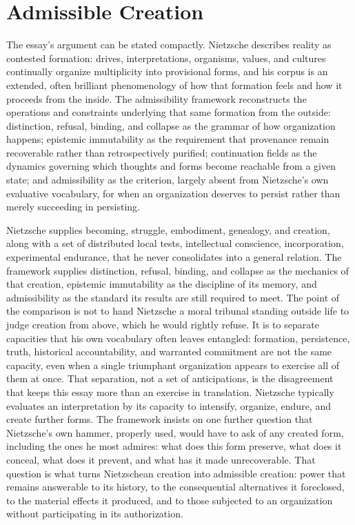 \documentclass[11pt]{article}
\begin{document}
\section*{Admissible Creation}

The essay's argument can be stated compactly. Nietzsche describes reality as contested formation: drives, interpretations, organisms, values, and cultures continually organize multiplicity into provisional forms, and his corpus is an extended, often brilliant phenomenology of how that formation feels and how it proceeds from the inside. The admissibility framework reconstructs the operations and constraints underlying that same formation from the outside: distinction, refusal, binding, and collapse as the grammar of how organization happens; epistemic immutability as the requirement that provenance remain recoverable rather than retrospectively purified; continuation fields as the dynamics governing which thoughts and forms become reachable from a given state; and admissibility as the criterion, largely absent from Nietzsche's own evaluative vocabulary, for when an organization deserves to persist rather than merely succeeding in persisting.

Nietzsche supplies becoming, struggle, embodiment, genealogy, and creation, along with a set of distributed local tests, intellectual conscience, incorporation, experimental endurance, that he never consolidates into a general relation. The framework supplies distinction, refusal, binding, and collapse as the mechanics of that creation, epistemic immutability as the discipline of its memory, and admissibility as the standard its results are still required to meet. The point of the comparison is not to hand Nietzsche a moral tribunal standing outside life to judge creation from above, which he would rightly refuse. It is to separate capacities that his own vocabulary often leaves entangled: formation, persistence, truth, historical accountability, and warranted commitment are not the same capacity, even when a single triumphant organization appears to exercise all of them at once. That separation, not a set of anticipations, is the disagreement that keeps this essay more than an exercise in translation. Nietzsche typically evaluates an interpretation by its capacity to intensify, organize, endure, and create further forms. The framework insists on one further question that Nietzsche's own hammer, properly used, would have to ask of any created form, including the ones he most admires: what does this form preserve, what does it conceal, what does it prevent, and what has it made unrecoverable. That question is what turns Nietzschean creation into admissible creation: power that remains answerable to its history, to the consequential alternatives it foreclosed, to the material effects it produced, and to those subjected to an organization without participating in its authorization.
\end{document}
